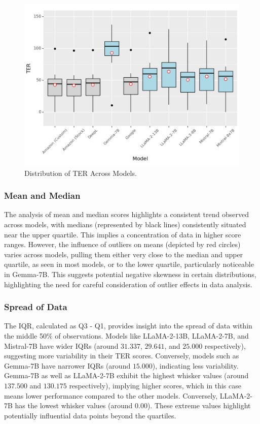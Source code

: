 \begin{figure}[htb]
        \centering
        \includegraphics[width=.9\textwidth]{textual/Figuras/Results/Unknown-95.png}
        \caption{Distribution of TER Across Models.}
        \label{fig: ter-models}
\end{figure}
        

\subsubsection{Mean and Median}

The analysis of mean and median scores highlights a consistent trend observed across models, with medians (represented by black lines) consistently situated near the upper quartile. This implies a concentration of data in higher score ranges. However, the influence of outliers on means (depicted by red circles) varies across models, pulling them either very close to the median and upper quartile, as seen in most models, or to the lower quartile, particularly noticeable in Gemma-7B. This suggests potential negative skewness in certain distributions, highlighting the need for careful consideration of outlier effects in data analysis.


\subsubsection{Spread of Data}

The IQR, calculated as Q3 - Q1, provides insight into the spread of data within the middle 50\% of observations. Models like LLaMA-2-13B, LLaMA-2-7B, and Mistral-7B have wider IQRs (around $31.337$, $29.641$, and $25.000$ respectively), suggesting more variability in their TER scores. Conversely, models such as Gemma-7B have narrower IQRs (around $15.000$), indicating less variability. Gemma-7B as well as LLaMA-2-7B exhibit the highest whisker values (around $137.500$ and $130.175$ respectively), implying higher scores, which in this case means lower performance compared to the other models. Conversely, LLaMA-2-7B has the lowest whisker values (around $0.00$). These extreme values highlight potentially influential data points beyond the quartiles.


